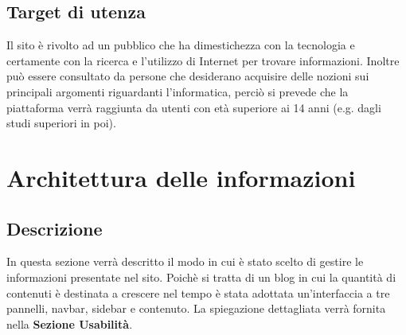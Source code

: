 \documentclass[12pt]{article}
\begin{document}
	\subsection{Target di utenza}
		Il sito è rivolto ad un pubblico che ha dimestichezza con la tecnologia e certamente con la ricerca e l'utilizzo di Internet per trovare informazioni. Inoltre può essere consultato da persone che desiderano acquisire delle nozioni sui principali argomenti riguardanti l'informatica, perciò si prevede che la piattaforma verrà raggiunta da utenti con età superiore ai 14 anni (e.g. dagli studi superiori in poi).
		
	\section{Architettura delle informazioni}
	\subsection{Descrizione}
		In questa sezione verrà descritto il modo in cui è stato scelto di gestire le informazioni presentate nel sito. Poichè si tratta di un blog in cui la quantità di contenuti è destinata a crescere nel tempo è stata adottata un'interfaccia a tre pannelli, navbar, sidebar e contenuto. La spiegazione dettagliata verrà fornita nella \textbf{Sezione \textbf{Usabilità}}.
\end{document}
